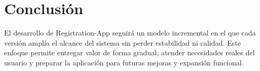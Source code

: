 \documentclass[11pt,a4paper]{article}
\begin{document}
\section{Conclusión}
El desarrollo de Registration-App seguirá un modelo incremental en el que cada versión amplía el alcance del sistema sin perder estabilidad ni calidad. Este enfoque permite entregar valor de forma gradual, atender necesidades reales del usuario y preparar la aplicación para futuras mejoras y expansión funcional.
\end{document}
